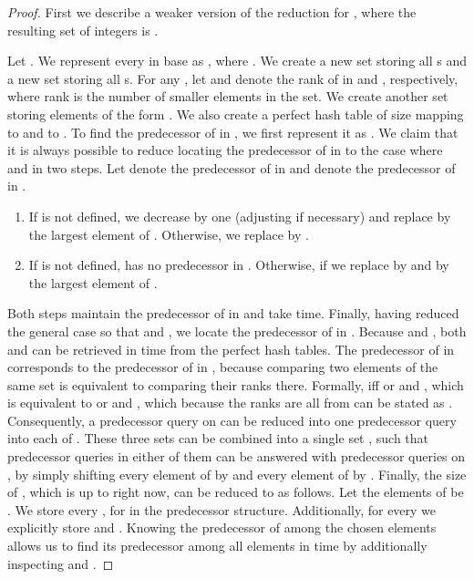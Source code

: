 \documentclass{llncs}
\begin{document}
\begin{proof}
First we describe a weaker version of the reduction for , where the resulting set of integers
is .

Let . We represent every  in base  as , where
. We create a new set  storing all s and
a new set  storing all s. For any , let
 and  denote the rank of  in  and , respectively,
where rank is the number of smaller elements in the set.
We create another set  storing 
elements of the form .
We also create a perfect hash table of size  mapping  to 
and  to .
To find the predecessor of  in , we first represent it as .
We claim that it is always possible to reduce locating the predecessor
of  in  to the case where  and  in two steps.
Let  denote the predecessor of  in  and  denote the predecessor of  in .

\begin{enumerate}
\item If  is not defined, we decrease  by one (adjusting  if necessary)
and replace  by the largest element of . Otherwise, we replace  by .
\item If  is not defined,  has no predecessor in . Otherwise, if  we replace
 by  and  by the largest element of .
\end{enumerate}

Both steps maintain the predecessor of  in  and take  time.
Finally, having reduced the general case so that  and , we
locate the predecessor of  in .
Because  and , both  and  can be
retrieved in  time from the perfect hash tables.
The predecessor of  in  corresponds to the predecessor of  in ,
because comparing two elements of the same set is equivalent to comparing their ranks there.
Formally,  iff  or  and , which is equivalent
to  or 
and , which because the ranks are all from 
can be stated as .
Consequently, a predecessor query on  can be reduced into one predecessor query
into each of . These three sets can be combined into a single set ,
such that predecessor queries in either of them
can be answered with predecessor queries on , by simply shifting every element of  by 
and every element of  by .
Finally, the size of , which is up to  right now, can be reduced to  as follows.
Let the elements of  be . We store every ,
for  in the predecessor structure. Additionally, for every  we
explicitly store  and . Knowing the predecessor  of  among the
chosen elements allows us to find its predecessor among all elements in  time by additionally
inspecting  and .


\end{proof}
\end{document}
